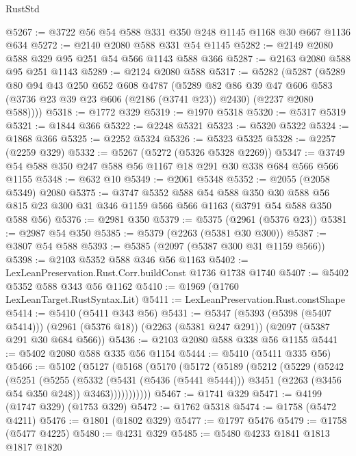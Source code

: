 \begin{lexlean}{RustStd}
\begin{coremodule}
@5267 := @3722 @56 @54 @588 @331 @350 @248 @1145 @1168 @30 @667 @1136 @634
@5272 := @2140 @2080 @588 @331 @54 @1145
@5282 := @2149 @2080 @588 @329 @95 @251 @54 @566 @1143 @588 @366
@5287 := @2163 @2080 @588 @95 @251 @1143
@5289 := @2124 @2080 @588
@5317 := @5282
    (@5287
      (@5289
        @80
        @94
        @43
        @250
        @652
        @608
        @4787
        (@5289
          @82
          @86
          @39
          @47
          @606
          @583
          (@3736 @23 @39 @23 @606 (@2186 (@3741 @23)) @2430)
          (@2237 @2080 @588))))
@5318 := @1772 @329
@5319 := @1970 @5318
@5320 := @5317 @5319
@5321 := @1844 @366
@5322 := @2248 @5321
@5323 := @5320 @5322
@5324 := @1868 @366
@5325 := @2252 @5324
@5326 := @5323 @5325
@5328 := @2257 (@2259 @329)
@5332 := @5267 (@5272 (@5326 @5328 @2269))
@5347 := @3749 @54 @588 @350 @247 @588 @56 @1167 @18 @291 @30 @338 @684 @566 @566 @1155
@5348 := @632 @10
@5349 := @2061 @5348
@5352 := @2055 (@2058 @5349) @2080
@5375 := @3747
    @5352
    @588
    @54
    @588
    @350
    @30
    @588
    @56
    @815
    @23
    @300
    @31
    @346
    @1159
    @566
    @566
    @1163
    (@3791 @54 @588 @350 @588 @56)
@5376 := @2981 @350
@5379 := @5375 (@2961 (@5376 @23))
@5381 := @2987 @54 @350
@5385 := @5379 (@2263 (@5381 @30 @300))
@5387 := @3807 @54 @588
@5393 := @5385 (@2097 (@5387 @300 @31 @1159 @566))
@5398 := @2103 @5352 @588 @346 @56 @1163
@5402 := LexLeanPreservation.Rust.Corr.buildConst @1736 @1738 @1740
@5407 := @5402 @5352 @588 @343 @56 @1162
@5410 := @1969 (@1760 LexLeanTarget.RustSyntax.Lit)
@5411 := LexLeanPreservation.Rust.constShape
@5414 := @5410 (@5411 @343 @56)
@5431 := @5347
    (@5393 (@5398 (@5407 @5414)))
    (@2961 (@5376 @18))
    (@2263 (@5381 @247 @291))
    (@2097 (@5387 @291 @30 @684 @566))
@5436 := @2103 @2080 @588 @338 @56 @1155
@5441 := @5402 @2080 @588 @335 @56 @1154
@5444 := @5410 (@5411 @335 @56)
@5466 := @5102
    (@5127
      (@5168
        (@5170
          (@5172
            (@5189
              (@5212
                (@5229
                  (@5242
                    (@5251
                      (@5255
                        (@5332
                          (@5431 (@5436 (@5441 @5444)))
                          @3451
                          (@2263 (@3456 @54 @350 @248))
                          @3463)))))))))))
@5467 := @1741 @329
@5471 := @4199 (@1747 @329) (@1753 @329)
@5472 := @1762 @5318
@5474 := @1758 (@5472 @4211)
@5476 := @1801 (@1802 @329)
@5477 := @1797 @5476
@5479 := @1758 (@5477 @4225)
@5480 := @4231 @329
@5485 := @5480 @4233 @1841 @1813 @1817 @1820

\end{coremodule}
\end{lexlean}
